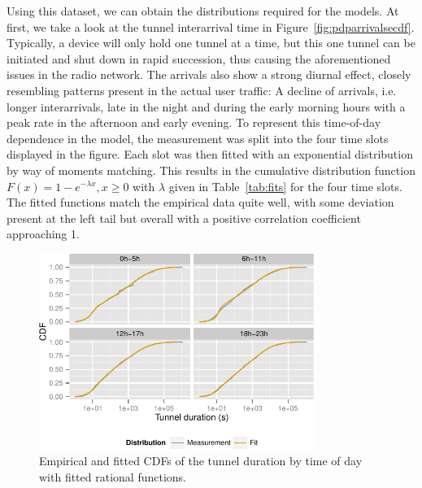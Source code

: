 Using this dataset, we can obtain the distributions required for the models. At first, we take a look at the tunnel interarrival time in Figure~\ref{fig:pdparrivalsecdf}.
Typically, a device will only hold one tunnel at a time, but this one tunnel can be initiated and shut down in rapid succession, thus causing the aforementioned issues in the radio network. The arrivals also show a strong diurnal effect, closely resembling patterns present in the actual user traffic: A decline of arrivals, i.e. longer interarrivals, late in the night and during the early morning hours with a peak rate in the afternoon and early evening. To represent this time-of-day dependence in the model, the measurement was split into the four time slots displayed in the figure. Each slot was then fitted with an exponential distribution by way of moments matching. This results in the cumulative distribution function $F(x) = 1- e^{-\lambda x}, x \geq 0$ with $\lambda$ given in Table~\ref{tab:fits} for the four time slots. The fitted functions match the empirical data quite well, with some deviation present at the left tail but overall with a positive correlation coefficient approaching 1.

\begin{figure}[htb]
  \centering
  \includegraphics[width=0.8\textwidth]{images/timeslot-fits.pdf}
  \caption{Empirical and fitted CDFs of the tunnel duration by time of day with fitted rational functions.}
  \label{c4:fig:fittedsdurationlots}
\end{figure}

